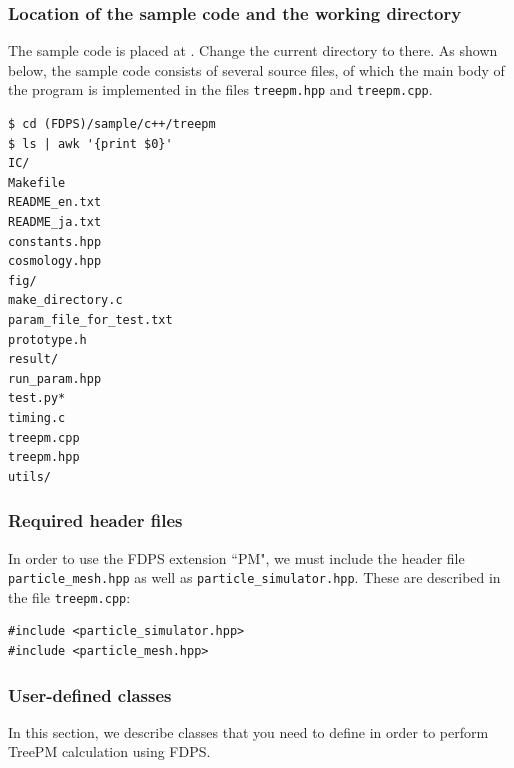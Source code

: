 \subsubsection{Location of the sample code and the working directory}
The sample code is placed at . Change the current directory to there.
As shown below, the sample code consists of several source files, of which the main body of the program is implemented in the files \texttt{treepm.hpp} and \texttt{treepm.cpp}.
\begin{screen}
\begin{verbatim}
$ cd (FDPS)/sample/c++/treepm
$ ls | awk '{print $0}'
IC/
Makefile
README_en.txt
README_ja.txt
constants.hpp
cosmology.hpp
fig/
make_directory.c
param_file_for_test.txt
prototype.h
result/
run_param.hpp
test.py*
timing.c
treepm.cpp
treepm.hpp
utils/
\end{verbatim}
\end{screen}

\subsubsection{Required header files}
In order to use the FDPS extension ``\textsf{PM}", we must include the header file \texttt{particle\_mesh.hpp} as well as \texttt{particle\_simulator.hpp}. These are described in the file \texttt{treepm.cpp}:
\begin{lstlisting}[caption=Include FDPS]
#include <particle_simulator.hpp>
#include <particle_mesh.hpp>
\end{lstlisting}

\subsubsection{User-defined classes}
In this section, we describe classes that you need to define in order to perform TreePM calculation using FDPS.


